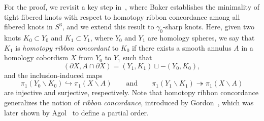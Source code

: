 \documentclass[11pt, reqno]{amsart}
\theoremstyle{definition}
\theoremstyle{remark}
\numberwithin{equation}{section}
\begin{document}
For the proof, we revisit a key step in~\cite[Lemma 2]{Baker:2016}, where Baker establishes the minimality of tight fibered knots with respect to homotopy ribbon concordance among all fibered knots in $S^3$, and we extend this result to $\gamma_0$-sharp knots.  
Here, given two knots $K_0 \subset Y_0$ and $K_1 \subset Y_1$, where $Y_0$ and $Y_1$ are homology spheres, we say that $K_1$ is \emph{homotopy ribbon concordant} to $K_0$ if there exists a smooth annulus $A$ in a homology cobordism $X$ from $Y_0$ to $Y_1$ such that
\[
(\partial X, A \cap \partial X) = (Y_1, K_1) \sqcup -(Y_0, K_0),
\]
and the inclusion-induced maps
\[
\pi_1(Y_0 \smallsetminus K_0) \hookrightarrow \pi_1(X \smallsetminus A) \qquad \text{and} \qquad \pi_1(Y_1 \smallsetminus K_1) \twoheadrightarrow \pi_1(X \smallsetminus A)
\]
are injective and surjective, respectively.
Note that homotopy ribbon concordance generalizes the notion of \emph{ribbon concordance}, introduced by Gordon~\cite[Lemma 3.1]{Gordon:1981}, which was later shown by Agol~\cite[Theorem 1.1]{Agol:2022} to define a partial order.  

%








%
\end{document}
